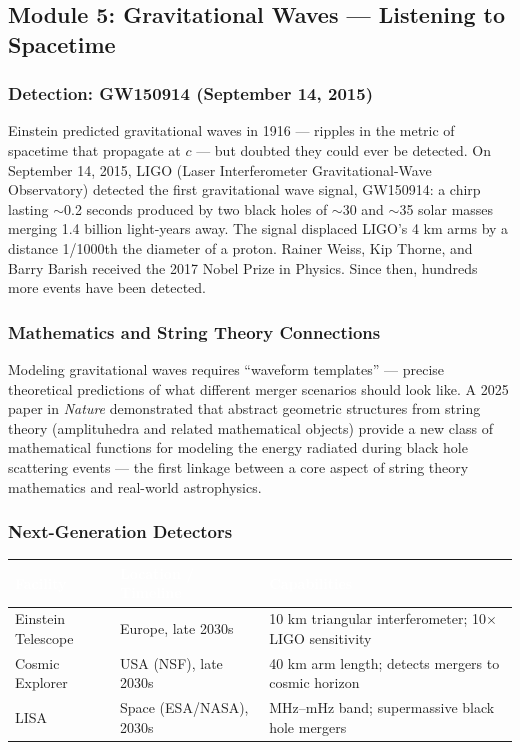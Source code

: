 \documentclass[11pt,letterpaper]{article}
\newcommand{\tableheader}[1]{\textbf{\sffamily\textcolor{white}{#1}}}
\begin{document}
\subsection{Module 5: Gravitational Waves --- Listening to Spacetime}

\subsubsection{Detection: GW150914 (September 14, 2015)}

Einstein predicted gravitational waves in 1916 --- ripples in the metric of spacetime that propagate at $c$ --- but doubted they could ever be detected. On September 14, 2015, LIGO (Laser Interferometer Gravitational-Wave Observatory) detected the first gravitational wave signal, GW150914: a chirp lasting $\sim$0.2 seconds produced by two black holes of $\sim$30 and $\sim$35 solar masses merging 1.4 billion light-years away. The signal displaced LIGO's 4 km arms by a distance 1/1000th the diameter of a proton. Rainer Weiss, Kip Thorne, and Barry Barish received the 2017 Nobel Prize in Physics. Since then, hundreds more events have been detected.

\subsubsection{Mathematics and String Theory Connections}

Modeling gravitational waves requires ``waveform templates'' --- precise theoretical predictions of what different merger scenarios should look like. A 2025 paper in \textit{Nature} demonstrated that abstract geometric structures from string theory (amplituhedra and related mathematical objects) provide a new class of mathematical functions for modeling the energy radiated during black hole scattering events --- the first linkage between a core aspect of string theory mathematics and real-world astrophysics.

\subsubsection{Next-Generation Detectors}

\begin{center}
\begin{tabularx}{\textwidth}{L{4cm}L{4cm}X}
\toprule
{}
\tableheader{Facility} & \tableheader{Location / Timeline} & \tableheader{Capabilities} \\
\midrule
Einstein Telescope & Europe, late 2030s & 10 km triangular interferometer; 10$\times$ LIGO sensitivity \\
Cosmic Explorer & USA (NSF), late 2030s & 40 km arm length; detects mergers to cosmic horizon \\
LISA & Space (ESA/NASA), 2030s & MHz--mHz band; supermassive black hole mergers \\
\bottomrule
\end{tabularx}
\end{center}
\end{document}
